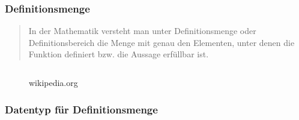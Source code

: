 \begin{frame}[fragile]
	\frametitle{Definitionsmenge}
	\begin{quote}
		In der Mathematik versteht man unter Definitionsmenge oder Definitionsbereich die Menge mit genau den Elementen, unter denen die Funktion definiert bzw. die Aussage erfüllbar ist.
	\end{quote}
	\begin{figure}
		\begin{minipage}{.3\textwidth}
			
			\caption{wikipedia.org}
		\end{minipage}\hspace{10mm}%
		\pause%
		\begin{minipage}{0.6\textwidth}
			\inputminted[fontsize=\small,firstline=5,lastline=17,framesep=5mm]{cpp}{../code/src/01_intro.cpp}
		\end{minipage}%
	\end{figure}
\end{frame}

\begin{frame}[fragile]
	\frametitle{Datentyp für Definitionsmenge}
	\inputminted[fontsize=\small,firstline=5,lastline=17,framesep=5mm]{cpp}{../code/src/02_intro.cpp}
\end{frame}

